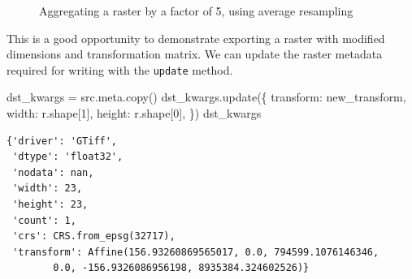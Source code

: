\documentclass[
  letterpaper,
]{krantz}
\newenvironment{Shaded}{\begin{snugshade}}{\end{snugshade}}
\newcommand{\DecValTok}[1]{\textcolor[rgb]{0.68,0.00,0.00}{#1}}
\newcommand{\NormalTok}[1]{\textcolor[rgb]{0.00,0.23,0.31}{#1}}
\newcommand{\OperatorTok}[1]{\textcolor[rgb]{0.37,0.37,0.37}{#1}}
\newcommand{\StringTok}[1]{\textcolor[rgb]{0.13,0.47,0.30}{#1}}
\begin{document}
\begin{figure}

\begin{minipage}{0.50\linewidth}



\end{minipage}%
%
\begin{minipage}{0.50\linewidth}



\end{minipage}%

\caption{\label{fig-raster-aggregate}Aggregating a raster by a factor of
5, using average resampling}

\end{figure}%

This is a good opportunity to demonstrate exporting a raster with
modified dimensions and transformation matrix. We can update the raster
metadata required for writing with the \texttt{update} method.

\begin{Shaded}
\begin{Highlighting}[]
\NormalTok{dst\_kwargs }\OperatorTok{=}\NormalTok{ src.meta.copy()}
\NormalTok{dst\_kwargs.update(\{}
    \StringTok{\textquotesingle{}transform\textquotesingle{}}\NormalTok{: new\_transform,}
    \StringTok{\textquotesingle{}width\textquotesingle{}}\NormalTok{: r.shape[}\DecValTok{1}\NormalTok{],}
    \StringTok{\textquotesingle{}height\textquotesingle{}}\NormalTok{: r.shape[}\DecValTok{0}\NormalTok{],}
\NormalTok{\})}
\NormalTok{dst\_kwargs}
\end{Highlighting}
\end{Shaded}

\begin{verbatim}
{'driver': 'GTiff',
 'dtype': 'float32',
 'nodata': nan,
 'width': 23,
 'height': 23,
 'count': 1,
 'crs': CRS.from_epsg(32717),
 'transform': Affine(156.93260869565017, 0.0, 794599.1076146346,
        0.0, -156.9326086956198, 8935384.324602526)}
\end{verbatim}
\end{document}
